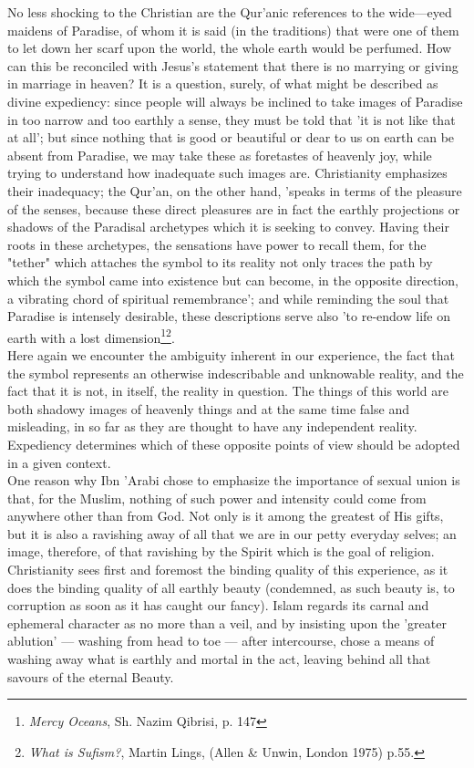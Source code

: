 \documentclass[11pt, b5paper, twoside]{book}
\begin{document}
No less shocking to the Christian are the Qur'anic references to the wide---eyed maidens of Paradise, 
of whom it is said (in the traditions) that were one of them to let down her scarf upon the world, 
the whole earth would be perfumed. How can this be reconciled with Jesus's statement that there is no 
marrying or giving in marriage in heaven? It is a question, surely, of what might be described as 
divine expediency: since people will always be inclined to take images of Paradise in too narrow and 
too earthly a sense, they must be told that 'it is not like that at all'; but since nothing that is 
good or beautiful or dear to us on earth can be absent from Paradise, we may take these as foretastes 
of heavenly joy, while trying to understand how inadequate such images are. Christianity emphasizes 
their inadequacy; the Qur'an, on the other hand, 'speaks in terms of the pleasure of the senses, 
because these direct pleasures are in fact the earthly projections or shadows of the Paradisal 
archetypes which it is seeking to convey. Having their roots in these archetypes, the sensations have 
power to recall them, for the "tether" which attaches the symbol to its reality not only traces the 
path by which the symbol came into existence but can become, in the opposite direction, a vibrating 
chord of spiritual remembrance'; and while reminding the soul that Paradise is intensely desirable, 
these descriptions serve also 'to re-endow life on earth with a lost dimension\footnote{\emph{Mercy Oceans}, Sh. Nazim Qibrisi, p. 147}\footnote{\emph{What is Sufism?}, Martin Lings, (Allen \& Unwin, London 1975) p.55.}. \\

Here again we encounter the ambiguity inherent in our experience, the fact that the symbol represents 
an otherwise indescribable and unknowable reality, and the fact that it is not, in itself, the 
reality in question. The things of this world are both shadowy images of heavenly things and at the 
same time false and misleading, in so far as they are thought to have any independent reality. 
Expediency determines which of these opposite points of view should be adopted in a given context. \\

One reason why Ibn 'Arabi chose to emphasize the importance of sexual union is that, for the Muslim, 
nothing of such power and intensity could come from anywhere other than from God. Not only is it 
among the greatest of His gifts, but it is also a ravishing away of all that we are in our petty 
everyday selves; an image, therefore, of that ravishing by the Spirit which is the goal of religion. 
Christianity sees first and foremost the binding quality of this experience, as it does the binding 
quality of all earthly beauty (condemned, as such beauty is, to corruption as soon as it has caught 
our fancy). Islam regards its carnal and ephemeral character as no more than a veil, and by insisting 
upon the 'greater ablution' --- washing from head to toe --- after intercourse, chose a means of washing 
away what is earthly and mortal in the act, leaving behind all that savours of the eternal Beauty. \\
\end{document}
